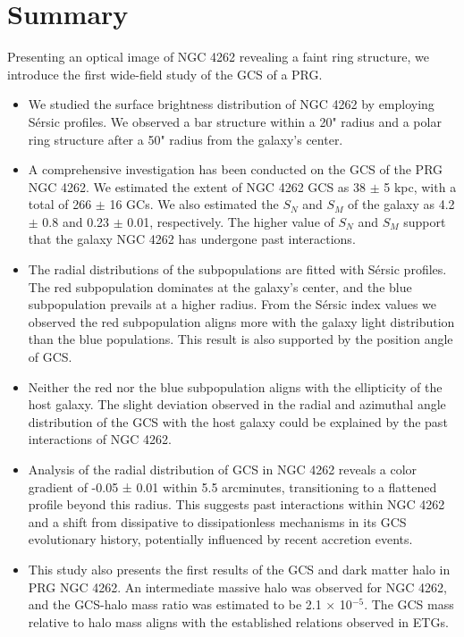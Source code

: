 \documentclass[fleqn,usenatbib]{mnras}
\begin{document}
\section{Summary}
\label{sec:summary}
Presenting an optical image of NGC 4262 revealing a faint ring structure, we introduce the first wide-field study of the GCS of a PRG.
\begin{itemize}
    \item We studied the surface brightness distribution of NGC 4262 by employing Sérsic profiles. We observed a bar structure within a 20" radius and a polar ring structure after a 50" radius from the galaxy's center.


    \item A comprehensive investigation has been conducted on the GCS of the PRG NGC 4262. We estimated the extent of NGC 4262 GCS as 38 $\pm$ 5 kpc, with a total of 266 $\pm$ 16 GCs. We also estimated the $S_{N}$ and $S_{M}$ of the galaxy as 4.2 $\pm$ 0.8 and 0.23 $\pm$ 0.01, respectively. The higher value of $S_{N}$ and $S_{M}$ support that the galaxy NGC 4262 has undergone past interactions. 
    
    \item The radial distributions of the subpopulations are fitted with Sérsic profiles. The red subpopulation dominates at the galaxy's center, and the blue subpopulation prevails at a higher radius. From the Sérsic index values we observed the red subpopulation aligns more with the galaxy light distribution than the blue populations. This result is also supported by the position angle of GCS.

    \item Neither the red nor the blue subpopulation aligns with the ellipticity of the host galaxy. The slight deviation observed in the radial and azimuthal angle distribution of the GCS with the host galaxy could be explained by the past interactions of NGC 4262.

    \item Analysis of the radial distribution of GCS in NGC 4262 reveals a color gradient of -0.05 ± 0.01 within 5.5 arcminutes, transitioning to a flattened profile beyond this radius. This suggests past interactions within NGC 4262 and a shift from dissipative to dissipationless mechanisms in its GCS evolutionary history, potentially influenced by recent accretion events.

    \item This study also presents the first results of the GCS and dark matter halo in PRG NGC 4262. An intermediate massive halo was observed for NGC 4262, and the GCS-halo mass ratio was estimated to be 2.1 × 10$^{-5}$. The GCS mass relative to halo mass aligns with the established relations observed in ETGs.


\end{itemize}
\end{document}
